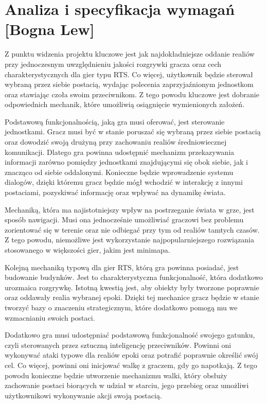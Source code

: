 \section{Analiza i specyfikacja wymagań [Bogna Lew]}
Z punktu widzenia projektu kluczowe jest jak najdokładniejsze oddanie realiów przy jednoczesnym uwzględnieniu jakości
rozgrywki gracza oraz cech charakterystycznych dla gier typu RTS. Co więcej, użytkownik będzie sterował
wybraną przez siebie postacią, wydając polecenia zaprzyjaźnionym jednostkom oraz stawiając czoła swoim przeciwnikom. Z
tego powodu kluczowe jest dobranie odpowiednich mechanik, które umożliwią osiągnięcie wymienionych założeń.

Podstawową funkcjonalnością, jaką gra musi oferować, jest sterowanie jednostkami. Gracz musi być w stanie poruszać się
wybraną przez siebie postacią oraz dowodzić swoją drużyną przy zachowaniu realiów średniowiecznej komunikacji. Dlatego
gra powinna udostępnić mechanizm przekazywania informacji zarówno pomiędzy jednostkami znajdującymi się obok siebie, jak
i znacząco od siebie oddalonymi. Konieczne będzie wprowadzenie systemu dialogów, dzięki któremu gracz będzie mógł wchodzić
w interakcję z innymi postaciami, pozyskiwać informację oraz wpływać na dynamikę świata.

Mechaniką, która ma najistotniejszy wpływ na postrzeganie świata w grze, jest sposób nawigacji. Musi ona jednocześnie
umożliwiać graczowi bez problemu zorientować się w terenie oraz nie odbiegać przy tym od realiów tamtych czasów. Z tego
powodu, niemożliwe jest wykorzystanie najpopularniejszego rozwiązania stosowanego w większości gier, jakim jest minimapa.

Kolejną mechaniką typową dla gier RTS, którą gra powinna posiadać, jest budowanie budynków. Jest to charakterystyczna
funkcjonalność, która dodatkowo urozmaica rozgrywkę. Istotną kwestią jest, aby obiekty były tworzone poprawnie oraz oddawały
realia wybranej epoki. Dzięki tej mechanice gracz będzie w stanie tworzyć bazy o znaczeniu strategicznym, które dodatkowo
pomogą mu we wzmacnianiu swoich postaci.

Dodatkowo gra musi udostępniać podstawową funkcjonalność swojego gatunku, czyli sterowanych przez sztuczną inteligencję
przeciwników. Powinni oni wykonywać ataki typowe dla realiów epoki oraz potrafić poprawnie określić swój cel. Co więcej,
powinni oni inicjować walkę z graczem, gdy go napotkają. Z tego powodu konieczne będzie utworzenie mechanizmu walki, który
obsłuży zachowanie postaci biorących w udział w starciu, jego przebieg oraz umożliwi użytkownikowi wykonywanie akcji
swoją postacią.

